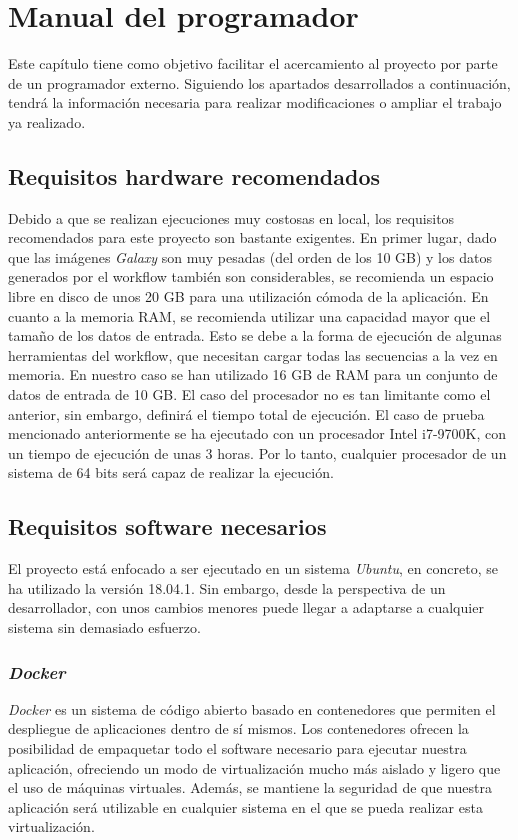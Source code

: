 \chapter{Manual del programador}
\label{Anexo:ManualProgramador}
Este capítulo tiene como objetivo facilitar el acercamiento al proyecto por parte de un programador externo. Siguiendo los apartados desarrollados a continuación, tendrá la información necesaria para realizar modificaciones o ampliar el trabajo ya realizado.

\section{Requisitos hardware recomendados}
Debido a que se realizan ejecuciones muy costosas en local, los requisitos recomendados para este proyecto son bastante exigentes.
En primer lugar, dado que las imágenes \textit{Galaxy} son muy pesadas (del orden de los 10 GB) y los datos generados por el workflow también son considerables, se recomienda un espacio libre en disco de unos 20 GB para una utilización cómoda de la aplicación.
En cuanto a la memoria RAM, se recomienda utilizar una capacidad mayor que el tamaño de los datos de entrada. Esto se debe a la forma de ejecución de algunas herramientas del workflow, que necesitan cargar todas las secuencias a la vez en memoria. En nuestro caso se han utilizado 16 GB de RAM para un conjunto de datos de entrada de 10 GB.
El caso del procesador no es tan limitante como el anterior, sin embargo, definirá el tiempo total de ejecución. El caso de prueba mencionado anteriormente se ha ejecutado con un procesador Intel i7-9700K, con un tiempo de ejecución de unas 3 horas. Por lo tanto, cualquier procesador de un sistema de 64 bits será capaz de realizar la ejecución.

\section{Requisitos software necesarios}
El proyecto está enfocado a ser ejecutado en un sistema \textit{Ubuntu}, en concreto, se ha utilizado la versión 18.04.1. Sin embargo, desde la perspectiva de un desarrollador, con unos cambios menores puede llegar a adaptarse a cualquier sistema sin demasiado esfuerzo.
    \subsection{\textit{Docker}}
    \textit{Docker} es un sistema de código abierto basado en contenedores que permiten el despliegue de aplicaciones dentro de sí mismos. Los contenedores ofrecen la posibilidad de empaquetar todo el software necesario para ejecutar nuestra aplicación, ofreciendo un modo de virtualización mucho más aislado y ligero que el uso de máquinas virtuales. Además, se mantiene la seguridad de que nuestra aplicación será utilizable en cualquier sistema en el que se pueda realizar esta virtualización.
    
